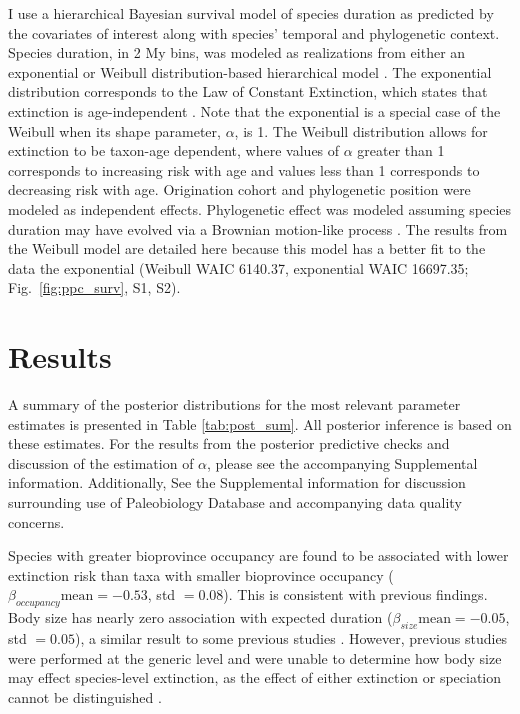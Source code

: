 \documentclass{pnastwo}
\begin{document}
\begin{article}
I use a hierarchical Bayesian survival model of species duration as predicted by the covariates of interest along with species' temporal and phylogenetic context. Species duration, in 2 My bins, was modeled as realizations from either an exponential or Weibull distribution-based hierarchical model \cite{Gelman2013d}. The exponential distribution corresponds to the Law of Constant Extinction, which states that extinction is age-independent \cite{VanValen1973}. Note that the exponential is a special case of the Weibull when its shape parameter, $\alpha$, is 1. The Weibull distribution allows for extinction to be taxon-age dependent, where values of $\alpha$ greater than 1 corresponds to increasing risk with age and values less than 1 corresponds to decreasing risk with age. Origination cohort and phylogenetic position were modeled as independent effects. Phylogenetic effect was modeled assuming species duration may have evolved via a Brownian motion-like process \cite{Lynch1991,Housworth2004}. The results from the Weibull model are detailed here because this model has a better fit to the data the exponential (Weibull WAIC 6140.37, exponential WAIC 16697.35; Fig.~\ref{fig:ppc_surv}, S1, S2).


\section{Results}
A summary of the posterior distributions for the most relevant parameter estimates is presented in Table \ref{tab:post_sum}. All posterior inference is based on these estimates. For the results from the posterior predictive checks and discussion of the estimation of $\alpha$, please see the accompanying Supplemental information. Additionally, See the Supplemental information for discussion surrounding use of Paleobiology Database and accompanying data quality concerns.

Species with greater bioprovince occupancy are found to be associated with lower extinction risk than taxa with smaller bioprovince occupancy (\(\beta_{occupancy} \text{mean} = -0.53\), std \(= 0.08\)). This is consistent with previous findings. Body size has nearly zero association with expected duration (\(\beta_{size} \text{mean} = -0.05\), std \(= 0.05\)), a similar result to some previous studies \cite{Tomiya2013}. However, previous studies were performed at the generic level and were unable to determine how body size may effect species-level extinction, as the effect of either extinction or speciation cannot be distinguished \cite{Liow2008,Tomiya2013}.


\end{article}
\end{document}

